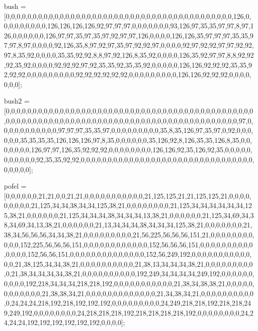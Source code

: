 bush = [0,0,0,0,0,0,0,0,0,0,0,0,0,0,0,0,0,0,0,0,0,0,0,0,0,0,0,0,0,0,0,0,0,0,0,0,0,0,0,0,0,0,126,0,0,0,0,0,0,0,0,0,126,126,126,126,92,97,97,97,0,0,0,0,0,0,0,93,126,97,35,35,97,97,8,97,126,0,0,0,0,0,0,126,97,97,35,97,35,97,92,97,97,126,0,0,0,0,126,126,35,97,97,97,35,35,97,97,8,97,0,0,0,0,92,126,35,8,97,92,97,35,97,92,92,97,0,0,0,0,92,97,92,92,97,97,92,92,97,8,35,92,0,0,0,0,35,35,92,92,8,8,97,92,126,8,35,92,0,0,0,0,126,35,92,97,97,8,8,92,92,92,35,92,0,0,0,0,92,92,92,97,92,35,35,92,35,35,92,0,0,0,0,0,126,126,92,92,92,35,35,92,92,92,0,0,0,0,0,0,0,0,0,92,92,92,92,92,92,0,0,0,0,0,0,0,0,0,126,126,92,92,92,0,0,0,0,0,0,0];

bush2 = [0,0,0,0,0,0,0,0,0,0,0,0,0,0,0,0,0,0,0,0,0,0,0,0,0,0,0,0,0,0,0,0,0,0,0,0,0,0,0,0,0,0,0,0,0,0,0,0,0,0,0,0,0,0,0,0,0,0,0,0,0,0,0,0,0,0,0,0,0,0,0,0,0,0,0,0,0,0,0,0,0,0,0,0,0,0,0,0,0,97,0,0,0,0,0,0,0,0,0,0,0,97,97,97,35,35,97,0,0,0,0,0,0,0,0,0,35,8,35,126,97,35,97,0,92,0,0,0,0,0,0,35,35,35,35,126,126,126,97,8,35,0,0,0,0,0,0,35,126,92,8,126,35,35,126,8,35,0,0,0,0,0,0,0,126,97,97,126,35,92,92,92,0,0,0,0,0,0,0,0,126,126,92,35,126,92,35,0,0,0,0,0,0,0,0,0,0,0,92,35,35,92,92,0,0,0,0,0,0,0,0,0,0,0,0,0,0,0,0,0,0,0,0,0,0,0,0,0,0,0,0,0,0,0,0,0,0,0,0,0];

pofel = [0,0,0,0,0,0,21,21,0,0,21,21,0,0,0,0,0,0,0,0,0,0,0,21,125,125,21,21,125,125,21,0,0,0,0,0,0,0,0,0,21,125,34,34,38,34,34,125,38,21,0,0,0,0,0,0,0,0,21,125,34,34,34,34,34,34,125,38,21,0,0,0,0,0,0,21,125,34,34,34,38,34,34,34,13,38,21,0,0,0,0,0,0,21,125,34,69,34,38,34,69,34,13,38,21,0,0,0,0,0,0,21,13,34,34,34,38,34,34,34,125,38,21,0,0,0,0,0,0,0,21,38,34,56,56,56,34,34,38,21,0,0,0,0,0,0,0,0,0,21,56,225,56,56,56,151,21,0,0,0,0,0,0,0,0,0,0,0,152,225,56,56,56,151,0,0,0,0,0,0,0,0,0,0,0,0,152,56,56,56,151,0,0,0,0,0,0,0,0,0,0,0,0,0,0,152,56,56,151,0,0,0,0,0,0,0,0,0,0,0,0,0,0,152,56,249,192,0,0,0,0,0,0,0,0,0,0,0,0,0,21,38,125,34,34,38,21,0,0,0,0,0,0,0,0,0,0,21,38,13,34,34,34,38,21,0,0,0,0,0,0,0,0,0,0,21,38,34,34,34,34,38,21,0,0,0,0,0,0,0,0,0,0,192,249,34,34,34,34,249,192,0,0,0,0,0,0,0,0,0,0,192,218,34,34,34,218,218,192,0,0,0,0,0,0,0,0,0,0,0,21,38,34,38,38,21,0,0,0,0,0,0,0,0,0,0,0,0,21,38,38,34,21,0,0,0,0,0,0,0,0,0,0,0,0,0,21,34,38,34,21,0,0,0,0,0,0,0,0,0,0,0,24,24,24,218,192,218,192,192,192,0,0,0,0,0,0,0,0,0,24,249,218,218,192,218,218,249,249,192,0,0,0,0,0,0,0,0,24,218,218,218,192,218,218,218,218,192,0,0,0,0,0,0,0,0,24,24,24,24,192,192,192,192,192,192,0,0,0,0];

